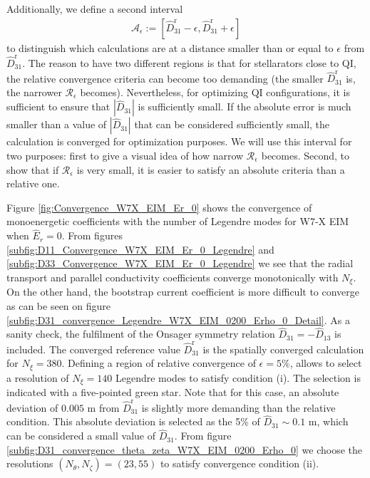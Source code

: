 Additionally, we define a second interval 
%
\begin{align}
	\mathcal{A}_{\epsilon}:=
	\left[
	\widehat{D}_{31}^{\text{r}}-\epsilon, \widehat{D}_{31}^{\text{r}}+\epsilon 
	\right]
\end{align}
to distinguish which calculations are at a distance smaller than or equal to $\epsilon$ from $\widehat{D}_{31}^{\text{r}}$. The reason to have two different regions is that for stellarators close to QI, the relative convergence criteria can become too demanding (the smaller $\widehat{D}_{31}^{\text{r}}$ is, the narrower $\mathcal{R}_{\epsilon}$ becomes). Nevertheless, for optimizing QI configurations, it is sufficient to ensure that $|\widehat{D}_{31}|$ is sufficiently small. If the absolute error is much smaller than a value of $|\widehat{D}_{31}|$ that can be considered sufficiently small, the calculation is converged for optimization purposes. We will use this interval for two purposes: first to give a visual idea of how narrow $\mathcal{R}_{\epsilon}$ becomes. Second, to show that if $\mathcal{R}_{\epsilon}$ is very small, it is easier to satisfy an absolute criteria than a relative one. 

Figure \ref{fig:Convergence_W7X_EIM_Er_0} shows the convergence of monoenergetic coefficients with the number of Legendre modes for W7-X EIM when $\widehat{E}_r=0$. From figures \ref{subfig:D11_Convergence_W7X_EIM_Er_0_Legendre} and \ref{subfig:D33_Convergence_W7X_EIM_Er_0_Legendre} we see that the radial transport and parallel conductivity coefficients converge monotonically with $N_\xi$. On the other hand, the bootstrap current coefficient is more difficult to converge as can be seen on figure \ref{subfig:D31_convergence_Legendre_W7X_EIM_0200_Erho_0_Detail}. As a sanity check, the fulfilment of the Onsager symmetry relation $\widehat{D}_{31}= - \widehat{D}_{13}$ is included. The converged reference value $\widehat{D}_{31}^{\text{r}}$ is the spatially converged calculation for $N_\xi=380$. Defining a region of relative convergence of $\epsilon=5\%$, allows to select a resolution of $N_\xi=140$ Legendre modes to satisfy condition (i). The selection is indicated with a five-pointed green star. Note that for this case, an absolute deviation of $0.005$ m from $\widehat{D}_{31}^{\text{r}}$ is slightly more demanding than the relative condition. This absolute deviation is selected as the 5\% of $\widehat{D}_{31}\sim 0.1$ m, which can be considered a small value of $\widehat{D}_{31}$. From figure \ref{subfig:D31_convergence_theta_zeta_W7X_EIM_0200_Erho_0} we choose the resolutions $(N_\theta,N_\zeta)=(23,55)$ to satisfy convergence condition (ii). 

